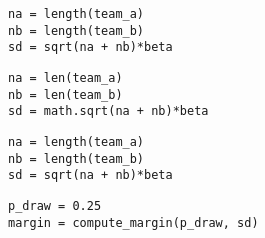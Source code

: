 \documentclass[article]{jss}
\newif\ifen
\newif\ifes
\newcommand{\en}[1]{\ifen#1\fi}
\newcommand{\es}[1]{\ifes#1\fi}
\begin{document}
\begin{lstlisting}[backgroundcolor=\color{white}, label=lst:draw, caption={\en{Computing the draw margin}\es{Computando el margen de empate}}, belowskip=-1.0 \baselineskip, aboveskip=-0 \baselineskip]
\end{lstlisting}
\begin{paracol}{3}
\begin{lstlisting}[backgroundcolor=\color{julia},belowskip=-0.77 \baselineskip]
na = length(team_a)
nb = length(team_b)
sd = sqrt(na + nb)*beta
\end{lstlisting}
\switchcolumn
\begin{lstlisting}[backgroundcolor=\color{python},belowskip=-0.77 \baselineskip]
na = len(team_a)
nb = len(team_b)
sd = math.sqrt(na + nb)*beta
\end{lstlisting}
\switchcolumn
\begin{lstlisting}[backgroundcolor=\color{r},belowskip=-0.77 \baselineskip]
na = length(team_a)
nb = length(team_b)
sd = sqrt(na + nb)*beta
\end{lstlisting}
\end{paracol}
\begin{lstlisting}[backgroundcolor=\color{all}]
p_draw = 0.25
margin = compute_margin(p_draw, sd)
\end{lstlisting}
%
\en{Where \texttt{team\_a} and \texttt{team\_b} were initialized in code~\ref{lst:game}, and \texttt{beta} in the code~\ref{lst:parameters}.}
\es{Donde \texttt{team\_a} y \texttt{team\_b} fueron inicializadas en el c\'odigo \ref{lst:game}, y \texttt{beta} en el código~\ref{lst:parameters}.}
\end{document}
